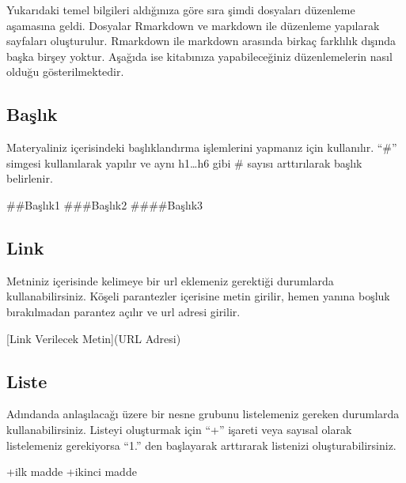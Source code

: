 \documentclass[]{book}
\newenvironment{Shaded}{\begin{snugshade}}{\end{snugshade}}
\newcommand{\OtherTok}[1]{\textcolor[rgb]{0.56,0.35,0.01}{#1}}
\newcommand{\NormalTok}[1]{#1}
\begin{document}
Yukarıdaki temel bilgileri aldığınıza göre sıra şimdi dosyaları
düzenleme aşamasına geldi. Dosyalar Rmarkdown ve markdown ile düzenleme
yapılarak sayfaları oluşturulur. Rmarkdown ile markdown arasında birkaç
farklılık dışında başka birşey yoktur. Aşağıda ise kitabınıza
yapabileceğiniz düzenlemelerin nasıl olduğu gösterilmektedir.

\subsection{Başlık}\label{baslk}

Materyaliniz içerisindeki başlıklandırma işlemlerini yapmanız için
kullanılır. ``\#'' simgesi kullanılarak yapılır ve aynı h1\ldots{}h6
gibi \# sayısı arttırılarak başlık belirlenir.

\begin{Shaded}
\begin{Highlighting}[]
\NormalTok{##Başlık1}
\NormalTok{###Başlık2}
\NormalTok{####Başlık3}
\end{Highlighting}
\end{Shaded}

\subsection{Link}\label{link}

Metniniz içerisinde kelimeye bir url eklemeniz gerektiği durumlarda
kullanabilirsiniz. Köşeli parantezler içerisine metin girilir, hemen
yanına boşluk bırakılmadan parantez açılır ve url adresi girilir.

\begin{Shaded}
\begin{Highlighting}[]
\OtherTok{[Link Verilecek Metin](URL Adresi)}
\end{Highlighting}
\end{Shaded}

\subsection{Liste}\label{liste}

Adındanda anlaşılacağı üzere bir nesne grubunu listelemeniz gereken
durumlarda kullanabilirsiniz. Listeyi oluşturmak için ``+'' işareti veya
sayısal olarak listelemeniz gerekiyorsa ``1.'' den başlayarak arttırarak
listenizi oluşturabilirsiniz.

\begin{Shaded}
\begin{Highlighting}[]
\NormalTok{+ilk madde}
\NormalTok{+ikinci madde}
\end{Highlighting}
\end{Shaded}
\end{document}
